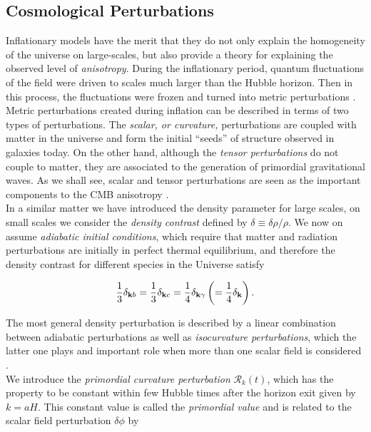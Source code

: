 \documentclass{rmaa}
\def\beq{\begin{equation}}
\def\eeq{\end{equation}}
\begin{document}
\subsection{Cosmological Perturbations}


Inflationary models have the merit that they do not only explain the 
 homogeneity of the universe on large-scales,
but also provide a theory  for explaining the observed level of {\em
anisotropy}. During the inflationary period, quantum fluctuations of the field 
were driven to scales much larger than the Hubble horizon. Then in this process, the fluctuations
were frozen and turned into metric perturbations \citep{Mukhanov}. 
%
Metric perturbations created during inflation can be described in terms of two types of perturbations.
The {\it scalar, or curvature,} perturbations are coupled with matter in the
universe and form the initial ``seeds'' of structure observed in galaxies today. On the other hand, although the 
{\it tensor perturbations} do not couple to matter, they are associated
to the generation of primordial gravitational waves.
As we shall see, scalar and tensor perturbations are seen as the important components to 
 the CMB anisotropy \citep{Hu}. 
\\

In a similar matter we have introduced the density parameter for large scales, on small scales
we consider the \textit{density contrast} defined by $\delta \equiv \delta \rho / \rho$.
We now on assume \textit{adiabatic initial conditions}, which require that matter and radiation perturbations 
are initially in perfect thermal equilibrium, and therefore the
density contrast for different species in the Universe satisfy 

 \beq
 {1 \over 3}\delta_{{\bf k} b}={1 \over 3}\delta_{{\bf k} c}={1 \over 4}\delta_{{\bf k} \gamma}
 \left(={1 \over 4}\delta_{{\bf k} }\right).
 \eeq 

\noindent
The most general density perturbation is described by a linear combination between adiabatic
perturbations as well as \textit{isocurvature perturbations}, which the latter one plays and important role 
when more than one scalar field is considered  \citep{LiddleLyth}.
\\

We introduce the \textit{primordial curvature perturbation} $\mathcal{R}_k(t)$, which has the property 
to be constant within few Hubble times after the horizon exit given by $k=aH$.  
This constant value is called the
\textit{primordial value} and is related to the scalar field perturbation $\delta \phi$ by
\end{document}

